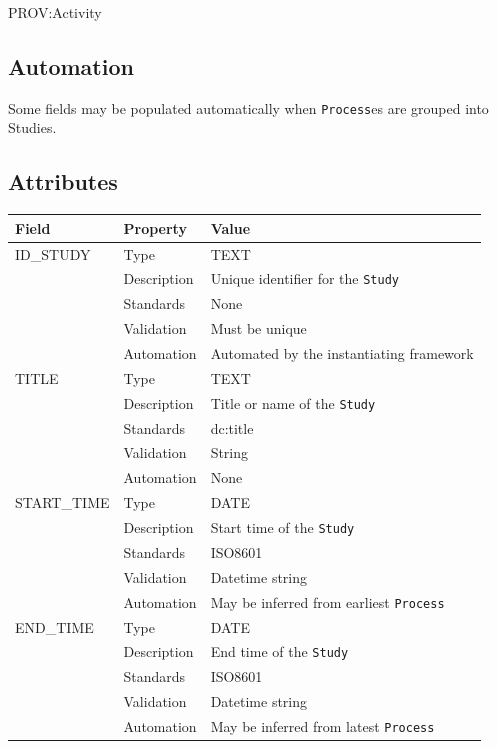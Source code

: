 \documentclass[
]{article}
\newcounter{none} %
\begin{document}
PROV:Activity

\subsection{Automation}\label{automation-34}

Some fields may be populated automatically when \texttt{Process}es are
grouped into Studies.

\subsection{Attributes}\label{attributes-29}

{\def\LTcaptype{none} %
\begin{longtable}[]{@{}lll@{}}
\toprule\noalign{}
Field & Property & Value \\
\midrule\noalign{}
\endhead
\bottomrule\noalign{}
\endlastfoot
ID\_STUDY & Type & TEXT \\
& Description & Unique identifier for the \texttt{Study} \\
& Standards & None \\
& Validation & Must be unique \\
& Automation & Automated by the instantiating framework \\
TITLE & Type & TEXT \\
& Description & Title or name of the \texttt{Study} \\
& Standards & dc:title \\
& Validation & String \\
& Automation & None \\
START\_TIME & Type & DATE \\
& Description & Start time of the \texttt{Study} \\
& Standards & ISO8601 \\
& Validation & Datetime string \\
& Automation & May be inferred from earliest \texttt{Process} \\
END\_TIME & Type & DATE \\
& Description & End time of the \texttt{Study} \\
& Standards & ISO8601 \\
& Validation & Datetime string \\
& Automation & May be inferred from latest \texttt{Process} \\
\end{longtable}
}
\end{document}
